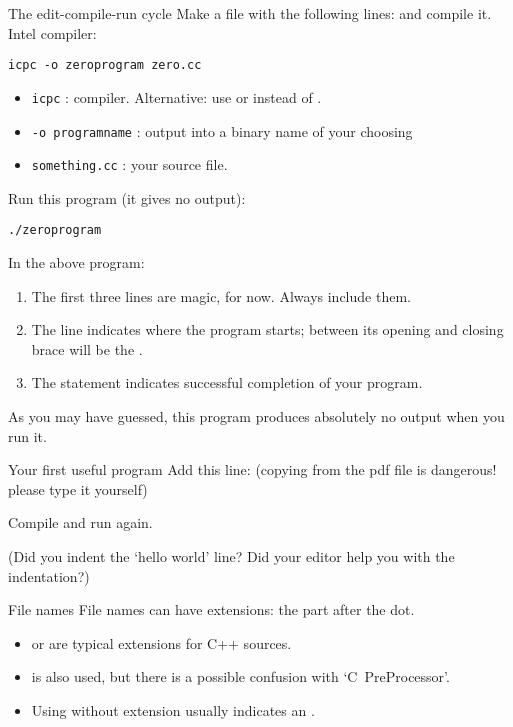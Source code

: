 \begin{exercise}{The edit-compile-run cycle}
\label{ex:compile-cycle}
  Make a file  with the following lines:
  and compile it. Intel compiler:
\begin{verbatim}
icpc -o zeroprogram zero.cc
\end{verbatim}
\begin{itemize}
\item \texttt{icpc} : compiler. Alternative: use 
  or  instead of .
\item \texttt{-o programname} : output into a binary name of your choosing
\item \texttt{something.cc} : your source file.
\end{itemize}

Run this program (it gives no output):
\begin{verbatim}
./zeroprogram
\end{verbatim}
\end{exercise}

In the above program:
\begin{enumerate}
\item The first three lines are magic, for now. Always include them.
\item The  line indicates where the program starts; between
  its opening and closing brace will be the
  .
\item The  statement indicates successful completion of your program.
\end{enumerate}
As you may have guessed, this program produces absolutely no output
when you run it.

\begin{exercise}{Your first useful program}
  \label{ex:sayhello}
Add this line:
%
%
(copying from the pdf file is dangerous! please type it yourself)

Compile and run again.

  (Did you indent the `hello world' line? Did your editor help you with
  the indentation?)

\end{exercise}



\begin{block}{File names}
  \label{sl:file-ext}
  File names can have extensions: the part after the dot.
  \begin{itemize}
  \item {} or  are typical extensions for
    C++ sources.
  \item {} is also used, but there is a
    possible confusion with `C~PreProcessor'.
  \item Using  without extension usually indicates an .
  \end{itemize}
\end{block}

